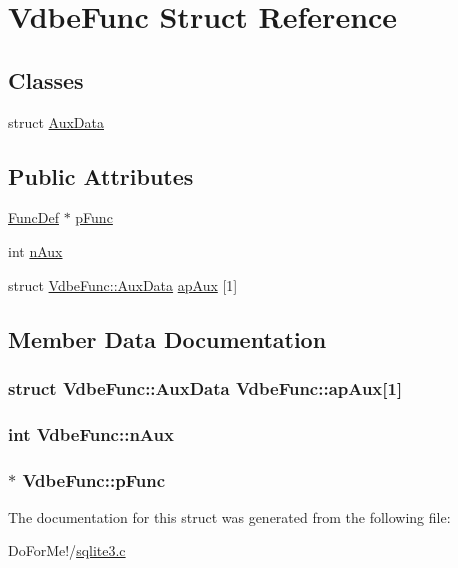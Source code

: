 \hypertarget{struct_vdbe_func}{\section{Vdbe\-Func Struct Reference}
\label{struct_vdbe_func}
}
\subsection*{Classes}
\begin{DoxyCompactItemize}
\item 
struct \hyperlink{struct_vdbe_func_1_1_aux_data}{Aux\-Data}
\end{DoxyCompactItemize}
\subsection*{Public Attributes}
\begin{DoxyCompactItemize}
\item 
\hyperlink{struct_func_def}{Func\-Def} $\ast$ \hyperlink{struct_vdbe_func_a73cbc96029bec2f37c7e2a79052a2f65}{p\-Func}
\item 
int \hyperlink{struct_vdbe_func_ad78feda4c310ea0bc17b7bba53bccd3c}{n\-Aux}
\item 
struct \hyperlink{struct_vdbe_func_1_1_aux_data}{Vdbe\-Func\-::\-Aux\-Data} \hyperlink{struct_vdbe_func_abb466d61a0d36b913418460e5922166a}{ap\-Aux} \mbox{[}1\mbox{]}
\end{DoxyCompactItemize}


\subsection{Member Data Documentation}
\hypertarget{struct_vdbe_func_abb466d61a0d36b913418460e5922166a}{
\subsubsection[{ap\-Aux}]{\setlength{\rightskip}{0pt plus 5cm}struct {\bf Vdbe\-Func\-::\-Aux\-Data}  Vdbe\-Func\-::ap\-Aux\mbox{[}1\mbox{]}}}\label{struct_vdbe_func_abb466d61a0d36b913418460e5922166a}
\hypertarget{struct_vdbe_func_ad78feda4c310ea0bc17b7bba53bccd3c}{
\subsubsection[{n\-Aux}]{\setlength{\rightskip}{0pt plus 5cm}int Vdbe\-Func\-::n\-Aux}}\label{struct_vdbe_func_ad78feda4c310ea0bc17b7bba53bccd3c}
\hypertarget{struct_vdbe_func_a73cbc96029bec2f37c7e2a79052a2f65}{
\subsubsection[{p\-Func}]{$\ast$ Vdbe\-Func\-::p\-Func}}\label{struct_vdbe_func_a73cbc96029bec2f37c7e2a79052a2f65}


The documentation for this struct was generated from the following file\-:\begin{DoxyCompactItemize}
\item 
Do\-For\-Me!/\hyperlink{sqlite3_8c}{sqlite3.\-c}\end{DoxyCompactItemize}
